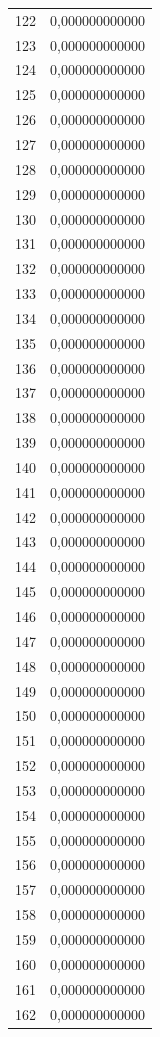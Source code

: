 \begin{tabular}{lr}
122 & 0,000000000000 \\
123 & 0,000000000000 \\
124 & 0,000000000000 \\
125 & 0,000000000000 \\
126 & 0,000000000000 \\
127 & 0,000000000000 \\
128 & 0,000000000000 \\
129 & 0,000000000000 \\
130 & 0,000000000000 \\
131 & 0,000000000000 \\
132 & 0,000000000000 \\
133 & 0,000000000000 \\
134 & 0,000000000000 \\
135 & 0,000000000000 \\
136 & 0,000000000000 \\
137 & 0,000000000000 \\
138 & 0,000000000000 \\
139 & 0,000000000000 \\
140 & 0,000000000000 \\
141 & 0,000000000000 \\
142 & 0,000000000000 \\
143 & 0,000000000000 \\
144 & 0,000000000000 \\
145 & 0,000000000000 \\
146 & 0,000000000000 \\
147 & 0,000000000000 \\
148 & 0,000000000000 \\
149 & 0,000000000000 \\
150 & 0,000000000000 \\
151 & 0,000000000000 \\
152 & 0,000000000000 \\
153 & 0,000000000000 \\
154 & 0,000000000000 \\
155 & 0,000000000000 \\
156 & 0,000000000000 \\
157 & 0,000000000000 \\
158 & 0,000000000000 \\
159 & 0,000000000000 \\
160 & 0,000000000000 \\
161 & 0,000000000000 \\
162 & 0,000000000000 \\

\end{tabular}
